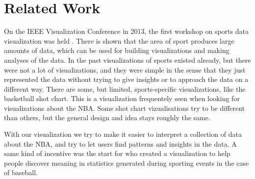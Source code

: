 \documentclass{sigchi}
\begin{document}
\section{Related Work}\label{sec:literature}

On the IEEE Visualization Conference in 2013, the first workshop on sports data visualization was held \cite{ieeevis}. There is shown that the area of sport produces large amounts of data, which can be used for building visualizations and making analyses of the data. In the past visualizations of sports existed already, but there were not a lot of visualizations, and they were simple in the sense that they just represented the data without trying to give insights or to approach the data on a different way. There are some, but limited, sports-specific visualizations, like the basketball shot chart. This is a visualization frequentely seen when looking for visualizations about the NBA. Some shot chart vizualisations try to be different than others, but the general design and idea stays roughly the same. 

With our visualization we try to make it easier to interpret a collection of data about the NBA, and try to let users find patterns and insights in the data. A same kind of incentive was the start for \cite{cox2006sportsvis} who created a visualization to help people discover meaning in statistics generated during sporting events in the case of baseball.





\end{document}
